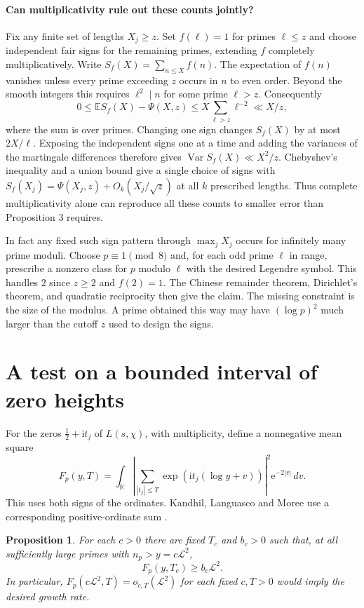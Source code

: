 \documentclass[11pt]{article}
\newtheorem{proposition}{Proposition}
\newcommand{\LL}{\mathcal L}
\newcommand{\e}{\mathrm e}
\newcommand{\ii}{\mathrm i}
\newcommand{\R}{\mathbb R}
\begin{document}
\paragraph{Can multiplicativity rule out these counts jointly?}
Fix any finite set of lengths $X_j\ge z$. Set $f(\ell)=1$ for primes
$\ell\le z$ and choose independent fair signs for the remaining primes,
extending $f$ completely multiplicatively. Write $S_f(X)=\sum_{n\le X}f(n)$.
The expectation of $f(n)$ vanishes unless every prime exceeding $z$
occurs in $n$ to even order. Beyond the smooth integers this requires
$\ell^2\mid n$ for some prime $\ell>z$. Consequently
\[
 0\le \mathbb E S_f(X)-\Psi(X,z)
 \le X\sum_{\ell>z}\ell^{-2}\ll X/z ,
\]
where the sum is over primes. Changing one sign changes $S_f(X)$ by
at most $2X/\ell$. Exposing the independent signs one at a time and
adding the variances of the martingale differences therefore gives
$\operatorname{Var} S_f(X)\ll X^2/z$. Chebyshev's inequality and a
union bound give a single choice of signs with
$S_f(X_j)=\Psi(X_j,z)+O_k(X_j/\sqrt z)$ at all $k$ prescribed lengths.
Thus complete multiplicativity alone can reproduce all these counts
to smaller error than Proposition 3 requires.

In fact any fixed such sign pattern through $\max_j X_j$ occurs
for infinitely many prime moduli. Choose $p\equiv1\pmod8$ and, for
each odd prime $\ell$ in range, prescribe a nonzero class for $p$
modulo $\ell$ with the desired Legendre symbol. This handles $2$
since $z\ge2$ and $f(2)=1$. The Chinese remainder theorem, Dirichlet's
theorem, and quadratic reciprocity then give the claim. The missing
constraint is the size of the modulus. A prime obtained this way may
have $(\log p)^2$ much larger than the cutoff $z$ used to design the signs.

\section{A test on a bounded interval of zero heights}
For the zeros $\tfrac12+\ii t_j$ of $L(s,\chi)$, with multiplicity,
define a nonnegative mean square
\[
 F_p(y,T)=\int_{\R}\left|\sum_{|t_j|\le T}\exp(\ii t_j(\log y+v))\right|^2
                  \e^{-2|v|}\,dv .
\]
This uses both signs of the ordinates. Kandhil, Languasco and Moree
use a corresponding positive-ordinate sum \cite[Section 4]{klm}.

\begin{proposition}
For each $c>0$ there are fixed $T_c$ and $b_c>0$ such that, at all
sufficiently large primes with $n_p>y=c\LL^2$,
\[
 F_p(y,T_c)\ge b_c\LL^2 .
\]
In particular, $F_p(c\LL^2,T)=o_{c,T}(\LL^2)$ for each fixed $c,T>0$
would imply the desired growth rate.
\end{proposition}
\end{document}
